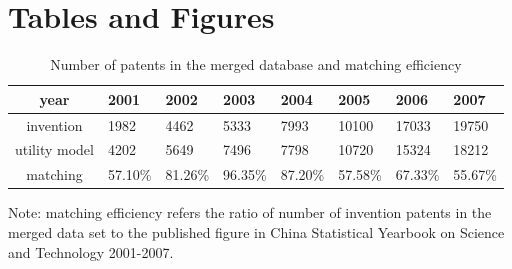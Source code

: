 \documentclass[English]{article}
\begin{document}




\newpage
\section*{Tables and Figures}

\begin{center}
\begin{table}[H]
\caption{Number of patents in the merged database and matching efficiency}
\label{T1}
\begin{centering}
\begin{tabular}{clllllll}
\hline\hline
year & 2001 & 2002 & 2003 & 2004 & 2005 & 2006 & 2007\\
\hline
invention & 1982 & 4462 & 5333 & 7993 & 10100 & 17033 & 19750 \\
utility model & 4202 & 5649 & 7496 & 7798 & 10720 & 15324 & 18212\\
\hline
matching  & 57.10\% & 81.26\% & 96.35\% & 87.20\% & 57.58\% & 67.33\% & 55.67\% \\
\hline
\hline
\end{tabular}
\par\end{centering}
{\small{}Note: matching efficiency refers the ratio of number of invention
patents in the merged data set to the published figure in China Statistical
Yearbook on Science and Technology 2001-2007.}{\small \par}
\end{table}
\par\end{center}
\end{document}
